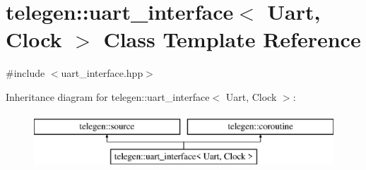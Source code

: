 \hypertarget{classtelegen_1_1uart__interface}{}\section{telegen\+:\+:uart\+\_\+interface$<$ Uart, Clock $>$ Class Template Reference}
\label{classtelegen_1_1uart__interface}


{\ttfamily \#include $<$uart\+\_\+interface.\+hpp$>$}

Inheritance diagram for telegen\+:\+:uart\+\_\+interface$<$ Uart, Clock $>$\+:\begin{figure}[H]
\begin{center}
\leavevmode
\includegraphics[height=2.000000cm]{classtelegen_1_1uart__interface}
\end{center}
\end{figure}
